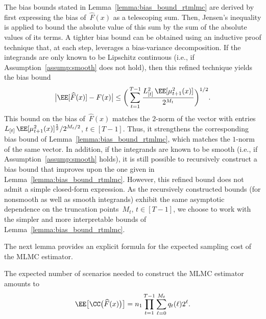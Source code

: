 \documentclass[11pt]{article}
\let\hat\widehat
\begin{document}
\begin{rem}
The bias bounds stated in Lemma~\ref{lemma:bias_bound_rtmlmc} are derived by first expressing the bias of~$\hat F(x)$ as a telescoping sum. Then, Jensen's inequality is applied to bound the absolute value of this sum by the sum of the absolute values of its terms. A tighter bias bound can be obtained using an inductive proof technique that, at each step, leverages a bias-variance decomposition. If the integrands are only known to be Lipschitz continuous (i.e., if Assumption~\ref{assump:smooth} does not hold), then this refined technique yields the bias bound
\begin{align*}
    \big|\EE[\hat{F}(x)] - F(x)\big| \leq \bigg(\sum_{t=1}^{T-1} \frac{L_{[t]}^2 \, \EE[\mu_{t+1}^2(x)]}{2^{M_t}} \bigg)^{1/2}.
\end{align*}
This bound on the bias of~$\hat F(x)$ matches the $2$-norm of the vector with entries $L_{[t]} \, \EE[\mu_{t+1}^2(x)]^\frac{1}{2}/2^{M_t/2}$, $t\in[T-1]$. Thus, it strengthens the corresponding bias bound of Lemma~\ref{lemma:bias_bound_rtmlmc},
which matches the $1$-norm of the same vector. In addition, if the integrands are known to be smooth (i.e., if Assumption~\ref{assump:smooth} holds), it is still possible to recursively construct a bias bound that improves upon the one given in Lemma~\ref{lemma:bias_bound_rtmlmc}. However, this refined bound does not admit a simple closed-form expression. As the recursively constructed bounds (for nonsmooth as well as smooth integrands) exhibit the same asymptotic dependence on the truncation points~$M_t$, $t \in [T-1]$, we choose to work with the simpler and more interpretable bounds of Lemma~\ref{lemma:bias_bound_rtmlmc}.
\end{rem}

The next lemma provides an explicit formula for the expected sampling cost of the MLMC estimator.

\begin{lemma}
\label{lemma:bound_on_cost_rtmlmc}
The expected number of scenarios needed to construct the MLMC estimator amounts to 
\begin{equation*}
   \EE\big[\CC\big(\hat{F}(x)\big)\big]= n_1 \prod_{t=1}^{T-1} \sum_{\ell=0}^{M_t} q_t(\ell)2^{\ell}.
\end{equation*}
\end{lemma}
\end{document}
